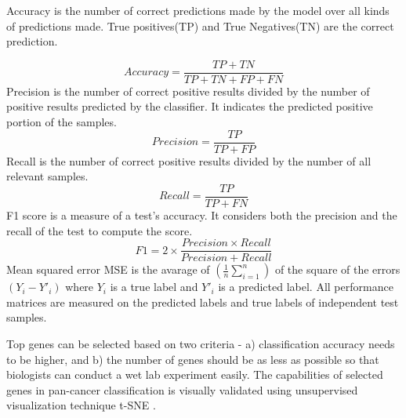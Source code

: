 \documentclass{bioinfo}
\begin{document}
{Accuracy is the number of correct predictions made by the model over all kinds of predictions made. True positives(TP) and True Negatives(TN) are the correct prediction. 

    \begin{equation}
        Accuracy = \frac{TP+TN}{TP+TN+FP+FN}
    \end{equation}
    Precision is the number of correct positive results divided by the number of positive results predicted by the classifier. It indicates the predicted positive portion of the samples. 
    \begin{equation}
        Precision = \frac{TP}{TP+FP}
    \end{equation}
    Recall is the number of correct positive results divided by the number of all relevant samples.
    \begin{equation}
        Recall = \frac{TP}{TP+FN}
    \end{equation}
	F1 score is a measure of a test's accuracy. It considers both the precision and the recall of the test to compute the score.
	\begin{equation}
        F1 = 2 \times \frac{Precision \times Recall}{Precision + Recall}
    \end{equation}
    Mean squared error MSE is the avarage of $(\frac{1}{n} \sum _{i=1} ^n)$ of the square of the errors $(Y_i - Y'_i)$ where $Y_i$ is a true label and $Y'_i$ is a predicted label. All performance matrices are measured on the predicted labels and true labels of independent test samples. 

Top genes can be selected based on two criteria - a) classification accuracy needs to be higher,
and b) the number of genes should be as less as possible so that biologists can conduct a wet lab experiment
easily. The capabilities of selected genes in pan-cancer classification is visually validated using unsupervised visualization technique t-SNE \citep{maaten2008visualizing}.


}
\end{document}
